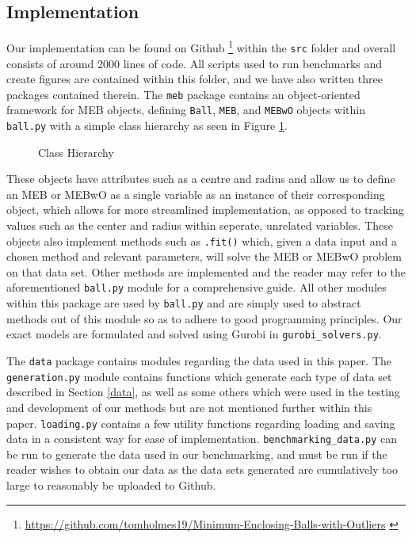 \documentclass[11pt,twoside]{report}
\theoremstyle{definition}
\numberwithin{theorem}{section}
\numberwithin{definition}{section}
\numberwithin{lemma}{section}
\numberwithin{proposition}{section}
\numberwithin{equation}{section}
\numberwithin{figure}{section}
\begin{document}
\subsection{Implementation}
Our implementation can be found on Github \footnote{\url{https://github.com/tomholmes19/Minimum-Enclosing-Balls-with-Outliers} \cite{Holmes_Minimum_Enclosing_Balls_2021}} within the \texttt{src} folder and overall consists of around 2000 lines of code. All scripts used to run benchmarks and create figures are contained within this folder, and we have also written three packages contained therein. The \texttt{meb} package contains an object-oriented framework for MEB objects, defining \texttt{Ball}, \texttt{MEB}, and \texttt{MEBwO} objects within \texttt{ball.py} with a simple class hierarchy as seen in Figure \ref{fig:hierarchy}. 

\begin{figure}
    \centering
    \caption{Class Hierarchy}
    \label{fig:hierarchy}
\end{figure}

These objects have attributes such as a centre and radius and allow us to define an MEB or MEBwO as a single variable as an instance of their corresponding object, which allows for more streamlined implementation, as opposed to tracking values such as the center and radius within seperate, unrelated variables. These objects also implement methods such as \texttt{.fit()} which, given a data input and a chosen method and relevant parameters, will solve the MEB or MEBwO problem on that data set. Other methods are implemented and the reader may refer to the aforementioned \texttt{ball.py} module for a comprehensive guide. All other modules within this package are used by \texttt{ball.py} and are simply used to abstract methods out of this module so as to adhere to good programming principles. Our exact models are formulated and solved using Gurobi in \texttt{gurobi\_solvers.py}.

The \texttt{data} package contains modules regarding the data used in this paper. The \texttt{generation.py} module contains functions which generate each type of data set described in Section \ref{data}, as well as some others which were used in the testing and development of our methods but are not mentioned further within this paper. \texttt{loading.py} contains a few utility functions regarding loading and saving data in a consistent way for ease of implementation. \texttt{benchmarking\_data.py} can be run to generate the data used in our benchmarking, and must be run if the reader wishes to obtain our data as the data sets generated are cumulatively too large to reasonably be uploaded to Github.
\end{document}
